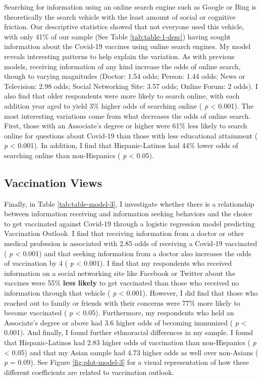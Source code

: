 Searching for information using an online search engine such as Google or Bing
is theoretically the search vehicle with the least amount of social or cognitive
friction. Our descriptive statistics showed that not everyone used this vehicle,
with only 41\% of our sample (See Table \ref{tab:table-1-desc}) having sought
information about the Covid-19 vaccines using online search engines. My model
reveals interesting patterns to help explain the variation. As with previous
models, receiving information of any kind increase the odds of online search,
though to varying magnitudes (Doctor: 1.54 odds; Person: 1.44 odds; News or Television: 2.98 odds; Social Networking Site: 3.57 odds; Online Forum: 2 odds). I also find that older respondents were more likely to search online, with each
addition year aged to yield 3\%
higher odds of searching online ( \emph{p} \textless{} 0.001). The most interesting variations
come from what decreases the odds of online search. First, those with an
Associate's degree or higher were 61\%
less likely to search online for questions about Covid-19 than those with less
educational attainment ( \emph{p} \textless{} 0.001). In addition, I find that Hispanic-Latinos
had 44\% lower odds of searching online than non-Hispanics ( \emph{p} \textless{} 0.05).

\hypertarget{vaccination-views}{%
\subsection{Vaccination Views}\label{vaccination-views}}



Finally, in Table \ref{tab:table-model-3}, I investigate whether there is a
relationship between information receiving and information seeking behaviors and
the choice to get vaccinated against Covid-19 through a logistic regression
model predicting Vaccination Outlook. I find that receiving information from a
doctor or other medical profession is associated with
2.85 odds of receiving
a Covid-19 vaccinated ( \emph{p} \textless{} 0.001) and that seeking information from a doctor
also increases the odds of vaccination by
4 ( \emph{p} \textless{} 0.001).
I find that my respondents who received information on a social networking site
like Facebook or Twitter about the vaccines were 55\%
\textbf{less likely} to get vaccinated than those who received no information through
that vehicle ( \emph{p} \textless{} 0.001). However, I did find that those who reached out to
family or friends with their concerns were
77\% more likely to become vaccinated ( \emph{p} \textless{} 0.05). Furthermore, my respondents who held an
Associate's degree or above had 3.6
higher odds of becoming immunized ( \emph{p} \textless{} 0.001). And finally, I found further
ethnoracial differences in my sample. I found that Hispanic-Latinos had
2.83 higher odds of vaccination
than non-Hispanics ( \emph{p} \textless{} 0.05) and that my Asian sample had
4.73 higher odds as well over
non-Asians ( \emph{p} = 0.09). See Figure \ref{fig:plot-model-3} for a visual
representation of how these different coefficients are related to vaccination outlook.

